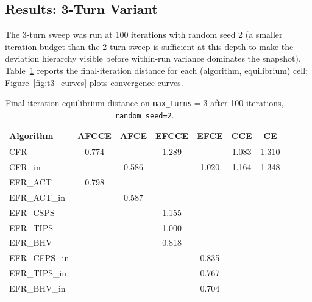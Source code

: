 \documentclass[11pt]{article}
\begin{document}
\subsection{Results: 3-Turn Variant}
\label{sec:results_t3}

The 3-turn sweep was run at 100 iterations with random seed 2 (a smaller iteration budget than the 2-turn sweep is sufficient at this depth to make the deviation hierarchy visible before within-run variance dominates the snapshot). Table~\ref{tab:t3_results} reports the final-iteration distance for each (algorithm, equilibrium) cell; Figure~\ref{fig:t3_curves} plots convergence curves.

\begin{table}[H]
\centering
\caption{Final-iteration equilibrium distance on \texttt{max\_turns}$=3$ after 100 iterations, \texttt{random\_seed=2}.}
\label{tab:t3_results}
\begin{tabular}{lcccccc}
\toprule
Algorithm & AFCCE & AFCE & EFCCE & EFCE & CCE & CE \\
\midrule
CFR             & 0.774 &       & 1.289 &       & 1.083 & 1.310 \\
CFR\_in         &       & 0.586 &       & 1.020 & 1.164 & 1.348 \\
EFR\_ACT        & 0.798 &       &       &       &       & \\
EFR\_ACT\_in    &       & 0.587 &       &       &       & \\
EFR\_CSPS       &       &       & 1.155 &       &       & \\
EFR\_TIPS       &       &       & 1.000 &       &       & \\
EFR\_BHV        &       &       & 0.818 &       &       & \\
EFR\_CFPS\_in   &       &       &       & 0.835 &       & \\
EFR\_TIPS\_in   &       &       &       & 0.767 &       & \\
EFR\_BHV\_in    &       &       &       & 0.704 &       & \\
\bottomrule
\end{tabular}
\end{table}
\end{document}
